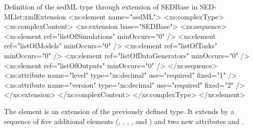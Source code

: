 \begin{myXmlLst}{Definition of the sedML type through extension of SEDBase in SED-ML}{lst:xmlExtension}
	<xs:element name="sedML">
		<xs:complexType>
			<xs:complexContent>
				<xs:extension base="SEDBase">
					<xs:sequence>
						<xs:element ref="listOfSimulations" minOccurs="0" />
						<xs:element ref="listOfModels" minOccurs="0" />
						<xs:element ref="listOfTasks" minOccurs="0" />
						<xs:element ref="listOfDataGenerators" minOccurs="0" />
						<xs:element ref="listOfOutputs" minOccurs="0" />
					</xs:sequence>
					<xs:attribute name="level" type="xs:decimal" use="required"
						fixed="1" />
					<xs:attribute name="version" type="xs:decimal" use="required"
						fixed="2" />
				</xs:extension>
			</xs:complexContent>
		</xs:complexType>
	</xs:element>
\end{myXmlLst}

The  element is an extension of the previously defined  type. It extends  by a sequence of five additional elements (, , , , and ) and two new attributes  and .
